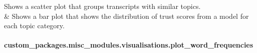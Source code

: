\documentclass[letterpaper,10pt,english]{sphinxhowto}
\begin{document}
\begin{savenotes}
\begin{tabulary}{\linewidth}[t]{}
Shows a scatter plot that groups transcripts with similar topics.
\\
\sphinxhline
\sphinxAtStartPar
{\hyperref[\detokenize{_autosummary/custom_packages.misc_modules.visualisations.plot_sentiment_by_topic:custom_packages.misc_modules.visualisations.plot_sentiment_by_topic}]{}}
&
\sphinxAtStartPar
Shows a bar plot that shows the distribution of trust scores from a model for each topic category.
\\
\sphinxbottomrule
\end{tabulary}
\sphinxtableafterendhook\par
\sphinxattableend\end{savenotes}

\sphinxstepscope


\paragraph{custom\_packages.misc\_modules.visualisations.plot\_word\_frequencies}
\label{\detokenize{_autosummary/custom_packages.misc_modules.visualisations.plot_word_frequencies:custom-packages-misc-modules-visualisations-plot-word-frequencies}}\label{\detokenize{_autosummary/custom_packages.misc_modules.visualisations.plot_word_frequencies::doc}}
\end{document}
